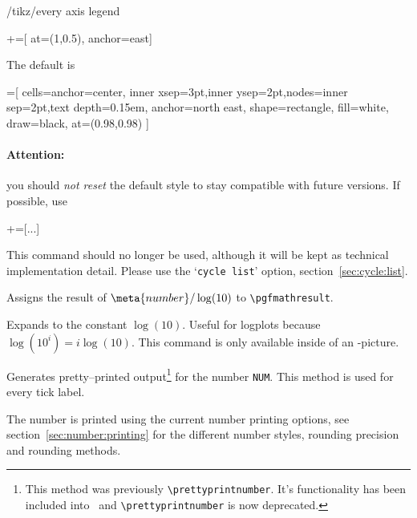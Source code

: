 {\begin{stylekey}{/tikz/every axis legend}
\begin{codeexample}[]
+=[
		at={(1,0.5)},
		anchor=east]
\end{codeexample}

\noindent
The default is
\begin{codeexample}
=[%
	cells={anchor=center},
	inner xsep=3pt,inner ysep=2pt,nodes={inner sep=2pt,text depth=0.15em},
	anchor=north east,%
	shape=rectangle,%
	fill=white,%
	draw=black,
	at={(0.98,0.98)}
]
\end{codeexample}
\paragraph{Attention:} you should \emph{not reset} the default style to stay compatible with future versions. If possible, use
\begin{codeexample}
+=[...]
\end{codeexample}
\end{stylekey}

}


\begin{command}{\autoplotspeclist}
This command should no longer be used, although it will be kept as technical implementation detail. Please use the `\texttt{cycle list}' option, section~\ref{sec:cycle:list}.
\end{command}

\begin{command}{\pgfmathlogtologten{}}
Assigns the result of $\meta{number}/\log(10)$ to \lstinline!\pgfmathresult!.
\end{command}

\begin{command}{\logten}
Expands to the constant $\log(10)$. Useful for logplots because $\log(10^i) = i\log(10)$. This command is only available inside of an \Tikz-picture.
\end{command}

\begin{command}{\pgfmathprintnumber{}}
Generates pretty--printed output\footnote{This method was previously \texttt{\textbackslash prettyprintnumber}. It's functionality has been included into \PGF\ and \texttt{\textbackslash prettyprintnumber} is now deprecated.} for the number \texttt{NUM}. This method is used for every tick label.

The number is printed using the current number printing options, see section~\ref{sec:number:printing} for the different number styles, rounding precision and rounding methods.
\end{command}

